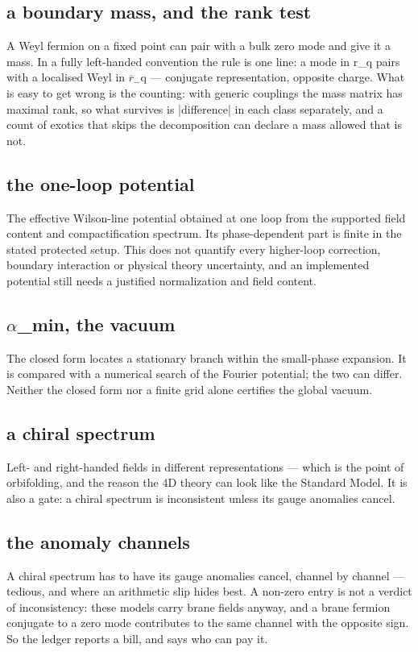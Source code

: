 \documentclass[11pt,a4paper]{article}
\begin{document}
\subsection*{a boundary mass, and the rank test}
A Weyl fermion on a fixed point can pair with a bulk zero mode and give it a mass. In a fully left-handed convention the rule is one line: a mode in r\_q pairs with a localised Weyl in \ensuremath{\overline{r}}\ensuremath{{}_{-}}q --- conjugate representation, opposite charge. What is easy to get wrong is the counting: with generic couplings the mass matrix has maximal rank, so what survives is |difference| in each class separately, and a count of exotics that skips the decomposition can declare a mass allowed that is not.

\subsection*{the one-loop potential}
The effective Wilson-line potential obtained at one loop from the supported field content and compactification spectrum. Its phase-dependent part is finite in the stated protected setup. This does not quantify every higher-loop correction, boundary interaction or physical theory uncertainty, and an implemented potential still needs a justified normalization and field content.

\subsection*{\ensuremath{\alpha}\_min, the vacuum}
The closed form locates a stationary branch within the small-phase expansion. It is compared with a numerical search of the Fourier potential; the two can differ. Neither the closed form nor a finite grid alone certifies the global vacuum.

\subsection*{a chiral spectrum}
Left- and right-handed fields in different representations --- which is the point of orbifolding, and the reason the 4D theory can look like the Standard Model. It is also a gate: a chiral spectrum is inconsistent unless its gauge anomalies cancel.

\subsection*{the anomaly channels}
A chiral spectrum has to have its gauge anomalies cancel, channel by channel --- tedious, and where an arithmetic slip hides best. A non-zero entry is not a verdict of inconsistency: these models carry brane fields anyway, and a brane fermion conjugate to a zero mode contributes to the same channel with the opposite sign. So the ledger reports a bill, and says who can pay it.
\end{document}
